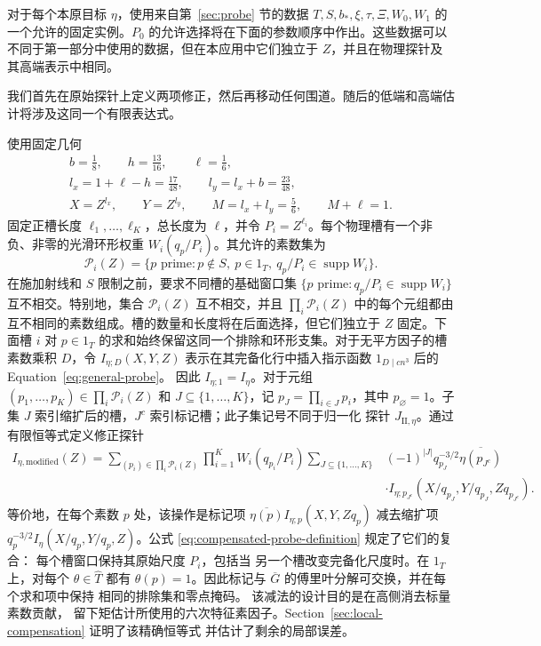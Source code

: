 \documentclass[11pt,a4paper]{article}
\numberwithin{equation}{section}
\numberwithin{figure}{section}
\theoremstyle{definition}
\theoremstyle{remark}
\begin{document}
对于每个本原目标 $\eta$，使用来自第~\ref{sec:probe} 节的数据 $T,S,b_*,\xi,\tau,\Xi,W_0,W_1$ 的一个允许的固定实例。$P_0$ 的允许选择将在下面的参数顺序中作出。这些数据可以不同于第一部分中使用的数据，但在本应用中它们独立于 $Z$，并且在物理探针及其高端表示中相同。

我们首先在原始探针上定义两项修正，然后再移动任何围道。随后的低端和高端估计将涉及这同一个有限表达式。

使用固定几何
\begin{equation}
 \begin{gathered}
 b=\frac18,\qquad h=\frac{13}{16},\qquad \ell=\frac16,\\
 l_x=1+\ell-h=\frac{17}{48},\qquad
 l_y=l_x+b=\frac{23}{48},\\
 X=Z^{l_x},\qquad Y=Z^{l_y},\qquad
 M=l_x+l_y=\frac56,\qquad M+\ell=1.
 \end{gathered}
 \label{old-eq:5.1}
\end{equation}
固定正槽长度 $\ell_1,\ldots,\ell_K$，总长度为 $\ell$，并令 $P_i=Z^{\ell_i}$。每个物理槽有一个非负、非零的光滑环形权重 $W_i(q_p/P_i)$。其允许的素数集为
\[
 \mathcal P_i(Z)=\{p\text{ prime}:p\notin S,\ p\in1_T,
                         \ q_p/P_i\in\operatorname{supp}W_i\}.
\]
在施加射线和 $S$ 限制之前，要求不同槽的基础窗口集 $\{p\text{ prime}:q_p/P_i\in\operatorname{supp}W_i\}$ 互不相交。特别地，集合 $\mathcal P_i(Z)$ 互不相交，并且 $\prod_i\mathcal P_i(Z)$ 中的每个元组都由互不相同的素数组成。槽的数量和长度将在后面选择，但它们独立于 $Z$ 固定。下面槽 $i$ 对 $p\in1_T$ 的求和始终保留这同一个排除和环形支集。对于无平方因子的槽素数乘积 $D$，令
$I_{\eta;D}(X,Y,Z)$ 表示在其完备化行中插入指示函数 $1_{D\mid cn^3}$ 后的
Equation~\eqref{eq:general-probe}。
因此 $I_{\eta;1}=I_\eta$。对于元组
$(p_1,\ldots,p_K)\in\prod_i\mathcal P_i(Z)$ 和
$J\subseteq\{1,\ldots,K\}$，记 $p_J=\prod_{i\in J}p_i$，其中
$p_\varnothing=1$。子集 $J$ 索引缩扩后的槽，$J^c$
索引标记槽；此子集记号不同于归一化
探针 $J_{\mathrm{II},\eta}$。通过有限恒等式定义修正探针
\begin{equation}\label{eq:compensated-probe-definition}
\begin{split}
 I_{\eta,\mathrm{modified}}(Z)
 =\sum_{(p_i)\in\prod_i\mathcal P_i(Z)}\prod_{i=1}^K W_i(q_{p_i}/P_i)
 \sum_{J\subseteq\{1,\ldots,K\}}&(-1)^{|J|}q_{p_J}^{-3/2}
          \overline{\eta(p_{J^c})}\\
 &\cdot I_{\eta;p_{J^c}}
       (X/q_{p_J},Y/q_{p_J},Zq_{p_{J^c}}).
\end{split}
\end{equation}
等价地，在每个素数 $p$ 处，该操作是标记项
$\overline{\eta(p)}I_{\eta;p}(X,Y,Zq_p)$ 减去缩扩项
$q_p^{-3/2}I_\eta(X/q_p,Y/q_p,Z)$。公式
\eqref{eq:compensated-probe-definition} 规定了它们的复合：
每个槽窗口保持其原始尺度 $P_i$，包括当
另一个槽改变完备化尺度时。在 $1_T$ 上，对每个 $\theta\in\widehat T$ 都有
$\theta(p)=1$。因此标记与
$\overline G$ 的傅里叶分解可交换，并在每个求和项中保持
相同的排除集和零点掩码。
该减法的设计目的是在高侧消去标量素数贡献，
留下矩估计所使用的六次特征素因子。Section~\ref{sec:local-compensation} 证明了该精确恒等式
并估计了剩余的局部误差。
\end{document}
